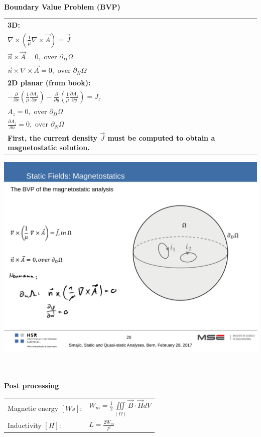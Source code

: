 \textbf{\\ Boundary Value Problem (BVP)\\}
\begin{minipage}[lt]{11cm}
	\begin{tabular}{l}
		\textbf{3D:} \\
		\(\displaystyle \nabla \times \left(\frac{1}{\mu}\nabla \times \vec{A}\right) = \vec{J} \) \\
		\(\displaystyle \vec{n} \times \vec{A} = 0, \textrm{ over } \partial_D\Omega \) \\
		\(\displaystyle \vec{n} \times \nabla \times \vec{A} = 0,\textrm{ over } \partial_N\Omega \) \\
		\textbf{2D planar (from book):} \\
		\(\displaystyle -\frac{\partial }{\partial x} \left(\frac{1}{\mu} \frac{\partial A_z}{\partial x}\right) - \frac{\partial }{\partial y} \left(\frac{1}{\mu} \frac{\partial A_z}{\partial y}\right) = J_z \) \\
		\(\displaystyle A_z = 0, \textrm{ over } \partial_D\Omega \) \\
		\(\displaystyle \frac{\partial A_z}{\partial n} = 0, \textrm{ over } \partial_N\Omega\) \\
		\textbf{First, the current density $\vec{J}$ must be computed to obtain a magnetostatic solution.}
	\end{tabular}
\end{minipage}
\begin{minipage}[rt]{8cm}
	\includegraphics[width=.8\textwidth]{./images/BVP_magnetostatic.pdf}
\end{minipage}

\textbf{\\ \\ Post processing \\ }
\begin{tabular}{ll}
	Magnetic energy $\left[Ws\right]$: & \(\displaystyle W_m = \frac{1}{2} \iiint\limits_{\left(\Omega\right)} \vec{B} \cdot \vec{H} dV \) \\
	Inductivity $\left[H\right]$: & \(\displaystyle L = \frac{2 W_m}{I^2} \) 
\end{tabular}